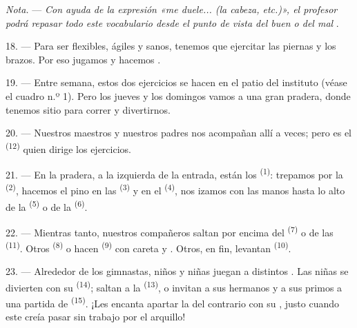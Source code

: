 \textit{Nota.} --- \textit{Con ayuda de la expresión «me duele... (la
cabeza, etc.)», el profesor podrá repasar todo este vocabulario desde el
punto de vista del buen o del mal} .

\VUsaut{5.0mm}
\VUsaut{2.4mm}
\VUsaut{3.0mm}

18. --- Para ser flexibles, ágiles y sanos, tenemos que ejercitar las
piernas y los brazos. Por eso jugamos y hacemos .

19. --- Entre semana, estos dos ejercicios se hacen en el patio del
instituto (véase el cuadro n.º 1). Pero los jueves y los domingos vamos a
una gran pradera, donde tenemos sitio para correr y divertirnos.

20. --- Nuestros maestros y nuestros padres nos acompañan allí a veces;
pero es el  \textsuperscript{(12)} quien dirige los
ejercicios.

21. --- En la pradera, a la izquierda de la entrada, están los
 \textsuperscript{(1)}: trepamos por la
 \textsuperscript{(2)}, hacemos el pino en las 
\textsuperscript{(3)} y en el  \textsuperscript{(4)}, nos izamos con las
manos hasta lo alto de la  \textsuperscript{(5)} o de la
 \textsuperscript{(6)}.

22. --- Mientras tanto, nuestros compañeros saltan por encima del
 \textsuperscript{(7)} o de las 
\textsuperscript{(11)}. Otros  \textsuperscript{(8)} o hacen
 \textsuperscript{(9)} con careta y . Otros, en fin,
levantan  \textsuperscript{(10)}.

\VUsaut{4.6mm}
\VUsaut{3.0mm}

23. --- Alrededor de los gimnastas, niños y niñas juegan a distintos
. Las niñas se divierten con su  \textsuperscript{(14)};
saltan a la  \textsuperscript{(13)}, o invitan a sus hermanos y a sus
primos a una partida de  \textsuperscript{(15)}. ¡Les encanta
apartar la  del contrario con su ,
justo cuando este creía pasar sin trabajo por el arquillo!

